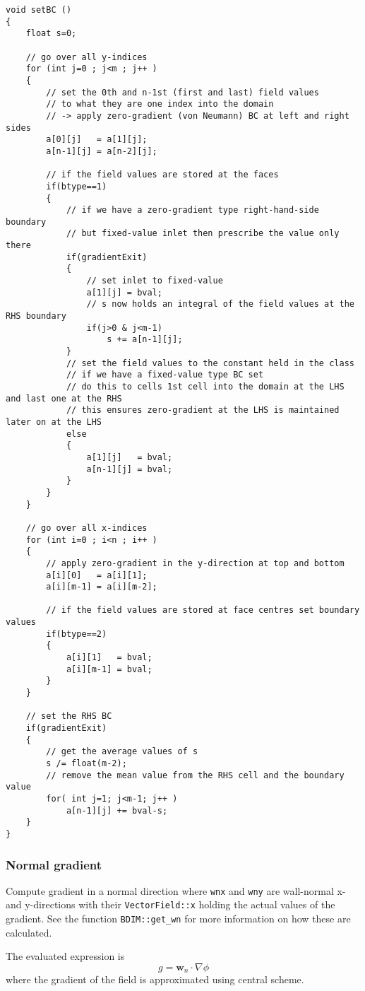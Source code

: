 \documentclass[notitlepage]{article}
\begin{document}
\begin{lstlisting}[style=myCpp]
void setBC ()
{
	float s=0;

	// go over all y-indices
	for (int j=0 ; j<m ; j++ )
	{
		// set the 0th and n-1st (first and last) field values
		// to what they are one index into the domain
		// -> apply zero-gradient (von Neumann) BC at left and right sides
		a[0][j]   = a[1][j];
		a[n-1][j] = a[n-2][j];
	
		// if the field values are stored at the faces
		if(btype==1)
		{
			// if we have a zero-gradient type right-hand-side boundary
			// but fixed-value inlet then prescribe the value only there
			if(gradientExit)
			{
				// set inlet to fixed-value
				a[1][j] = bval;
				// s now holds an integral of the field values at the RHS boundary
				if(j>0 & j<m-1)
					s += a[n-1][j];          
			}
			// set the field values to the constant held in the class
			// if we have a fixed-value type BC set
			// do this to cells 1st cell into the domain at the LHS and last one at the RHS
			// this ensures zero-gradient at the LHS is maintained later on at the LHS
			else
			{
				a[1][j]   = bval;  
				a[n-1][j] = bval;
			}
		}
	}

	// go over all x-indices
	for (int i=0 ; i<n ; i++ )
	{
		// apply zero-gradient in the y-direction at top and bottom
		a[i][0]   = a[i][1];
		a[i][m-1] = a[i][m-2];
	
		// if the field values are stored at face centres set boundary values
		if(btype==2)
		{
			a[i][1]   = bval;  
			a[i][m-1] = bval;
		}
	}

	// set the RHS BC
	if(gradientExit)
	{
		// get the average values of s
		s /= float(m-2);
		// remove the mean value from the RHS cell and the boundary value
		for( int j=1; j<m-1; j++ )
			a[n-1][j] += bval-s;
	}
}
\end{lstlisting}

\subsubsection{Normal gradient}

Compute gradient in a normal direction where
\texttt{wnx} and \texttt{wny} are wall-normal x- and y-directions with their
\texttt{VectorField::x} holding the actual values of the gradient. See the function
\texttt{BDIM::get\_wn} for more information on how these are calculated.

The evaluated expression is
%
\begin{equation}
g = \mathbf{w}_n \cdot \nabla \phi
\end{equation}
%
where the gradient of the field is approximated using central scheme.
\end{document}
